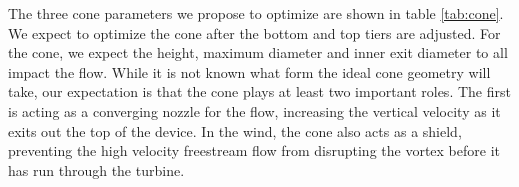 %
%

The three cone parameters we propose to optimize are shown in table
\ref{tab:cone}. We expect to optimize the cone after the bottom and top
tiers are adjusted. For the cone, we expect the height, maximum diameter
and inner exit diameter to all impact the flow. While it is not known
what form the ideal cone geometry will take, our expectation is that the
cone plays at least two important roles. The first is acting as a
converging nozzle for the flow, increasing the vertical velocity as it
exits  out the top of the device. In the wind, the cone also acts as a
shield, preventing the high velocity freestream flow from disrupting the
vortex before it has run through the turbine. 

